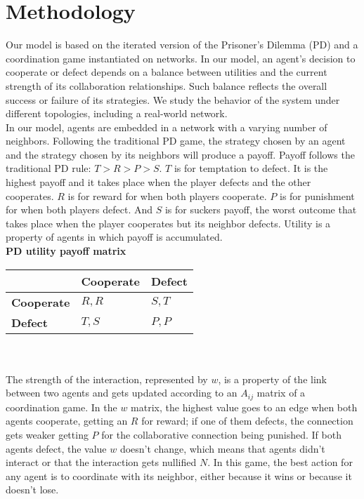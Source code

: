 \documentclass{bmcart}
\begin{document}
\section*{Methodology}


Our model is based on the iterated version of the Prisoner's Dilemma (PD) and a
coordination game instantiated on
networks. In our model, an agent's decision to
cooperate or defect depends on a balance between
utilities and the current strength of its collaboration relationships. Such
balance reflects the overall success or failure of its strategies. We
study the behavior of the system under different topologies, including a
real-world network.\\  


In our model, agents are embedded in a network with a varying number of
neighbors. Following the traditional PD game, the strategy chosen by an agent
and the strategy chosen by its neighbors will produce a payoff. Payoff follows
the traditional PD rule: $T > R > P > S$. $T$ is for temptation to defect. It is the highest
payoff and it takes place when the player defects and the other cooperates. $R$
is for reward for when both players cooperate. $P$ is for punishment for when
both players defect. And $S$ is for suckers payoff, the worst outcome that
takes place when the player cooperates but its neighbor defects. Utility is a
property of agents in which payoff is accumulated.\\   

{\bf PD utility payoff matrix}\\

\begin{tabular}{| l | l | l |}
\hline
          & \bf{Cooperate} & \bf{Defect} \\ \hline
\bf{Cooperate} &  $R,R$      &  $S,T$   \\ \hline
\bf{Defect}    &  $T,S$      &  $P,P$   \\ \hline

\end{tabular}\\ \\

The strength of the interaction, represented by $w$, is a property of the link between two agents and
gets updated according to an $A_{ij}$ matrix of a coordination game. In the $w$ matrix, the highest value
goes to an edge when both agents cooperate, getting an $R$ for reward; if one of
them defects, the connection gets weaker getting $P$ for the collaborative
connection being punished. If both agents defect, the value $w$ doesn't change,
which means that agents didn't interact or that the interaction gets nullified
$N$. In this game, the best action for any agent is to coordinate with its
neighbor, either because it wins or because it doesn't lose. \\ 
\end{document}
